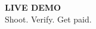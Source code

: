 {
\begin{frame}[plain]
  \centering\vspace{3em}
  {\fontsize{60}{66}\selectfont\bfseries\color{white}LIVE DEMO}\\[1em]
  {\Large\color{warm} Shoot. Verify. Get paid.}
\end{frame}
}
